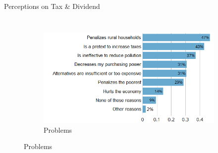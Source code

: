 \documentclass[aspectratio=169,9pt,dvipsnames]{beamer}
\begin{document}
\begin{frame}{Perceptions on Tax \& Dividend}
\begin{columns}
\begin{figure}[t]
\begin{subfigure}{\columnwidth}
   \caption{Problems}
   \includegraphics[width=.8\columnwidth]{Images/CC_problems_synchro.png}
\end{subfigure}
\label{fig:winners_losers}
\end{figure}

\end{columns}

    \end{frame}
\end{document}
